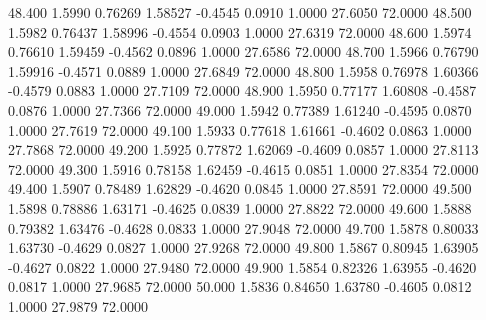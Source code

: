   48.400   1.5990   0.76269   1.58527  -0.4545   0.0910   1.0000  27.6050  72.0000
  48.500   1.5982   0.76437   1.58996  -0.4554   0.0903   1.0000  27.6319  72.0000
  48.600   1.5974   0.76610   1.59459  -0.4562   0.0896   1.0000  27.6586  72.0000
  48.700   1.5966   0.76790   1.59916  -0.4571   0.0889   1.0000  27.6849  72.0000
  48.800   1.5958   0.76978   1.60366  -0.4579   0.0883   1.0000  27.7109  72.0000
  48.900   1.5950   0.77177   1.60808  -0.4587   0.0876   1.0000  27.7366  72.0000
  49.000   1.5942   0.77389   1.61240  -0.4595   0.0870   1.0000  27.7619  72.0000
  49.100   1.5933   0.77618   1.61661  -0.4602   0.0863   1.0000  27.7868  72.0000
  49.200   1.5925   0.77872   1.62069  -0.4609   0.0857   1.0000  27.8113  72.0000
  49.300   1.5916   0.78158   1.62459  -0.4615   0.0851   1.0000  27.8354  72.0000
  49.400   1.5907   0.78489   1.62829  -0.4620   0.0845   1.0000  27.8591  72.0000
  49.500   1.5898   0.78886   1.63171  -0.4625   0.0839   1.0000  27.8822  72.0000
  49.600   1.5888   0.79382   1.63476  -0.4628   0.0833   1.0000  27.9048  72.0000
  49.700   1.5878   0.80033   1.63730  -0.4629   0.0827   1.0000  27.9268  72.0000
  49.800   1.5867   0.80945   1.63905  -0.4627   0.0822   1.0000  27.9480  72.0000
  49.900   1.5854   0.82326   1.63955  -0.4620   0.0817   1.0000  27.9685  72.0000
  50.000   1.5836   0.84650   1.63780  -0.4605   0.0812   1.0000  27.9879  72.0000
